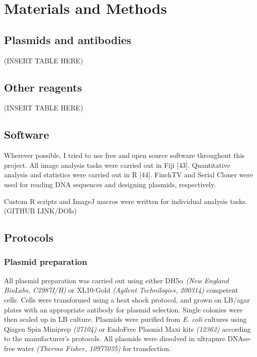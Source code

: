 \documentclass[
  12pt,
  a4paper,
]{book}
\begin{document}
\hypertarget{METHODS}{%
\chapter*{Materials and Methods}\label{METHODS}}


\hypertarget{plasmids-and-antibodies}{%
\section{Plasmids and antibodies}\label{plasmids-and-antibodies}}

(INSERT TABLE HERE)

\hypertarget{other-reagents}{%
\section{Other reagents}\label{other-reagents}}

(INSERT TABLE HERE)

\hypertarget{software}{%
\section{Software}\label{software}}

Wherever possible, I tried to use free and open source software throughout this project. All image analysis tasks were carried out in Fiji {[}43{]}. Quantitative analysis and statistics were carried out in R {[}44{]}. FinchTV and Serial Cloner were used for reading DNA sequences and designing plasmids, respectively.

Custom R scripts and ImageJ macros were written for individual analysis tasks. (GITHUB LINK/DOIs)

\hypertarget{protocols}{%
\section{Protocols}\label{protocols}}

\hypertarget{plasmid-prep}{%
\subsection{Plasmid preparation}\label{plasmid-prep}}

All plasmid preparation was carried out using either DH5\(\alpha\) \emph{(New England BioLabs, C2987I/H)} or XL10-Gold \emph{(Agilent Technilogies, 200314)} competent cells. Cells were transformed using a heat shock protocol, and grown on LB/agar plates with an appropriate antibody for plasmid selection. Single colonies were then scaled up in LB culture. Plasmids were purified from \emph{E. coli} cultures using Qiagen Spin Miniprep \emph{(27104)} or EndoFree Plasmid Maxi kits \emph{(12362)} according to the manufacturer's protocols. All plasmids were dissolved in ultrapure DNAse-free water \emph{(Thermo Fisher, 10977035)} for transfection.
\end{document}
